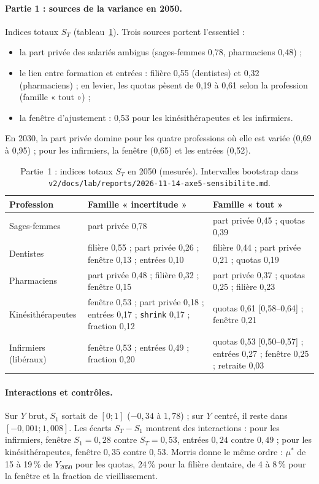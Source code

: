 \paragraph{Partie 1 : sources de la variance en 2050.} Indices totaux $S_T$ (tableau~\ref{sen:tab:st}). Trois sources
portent l'essentiel :
\begin{itemize}
  \item la part privée des salariés ambigus (sages-femmes 0,78\mesure{}, pharmaciens 0,48\mesure{}) ;
  \item le lien entre formation et entrées : filière 0,55\mesure{} (dentistes) et 0,32\mesure{} (pharmaciens) ;
        en levier, les quotas pèsent de 0,19 à 0,61\mesure{} selon la profession (famille « tout ») ;
  \item la fenêtre d'ajustement : 0,53\mesure{} pour les kinésithérapeutes et les infirmiers.
\end{itemize}
En 2030, la part privée domine pour les quatre professions où elle est variée (0,69 à 0,95\mesure{}) ; pour les
infirmiers, la fenêtre (0,65\mesure{}) et les entrées (0,52\mesure{}).

\begin{table}[h]
\centering\small
\begin{tabular}{lp{5.6cm}p{5.6cm}}
\toprule
Profession & Famille « incertitude » & Famille « tout » \\
\midrule
Sages-femmes & part privée 0,78 & part privée 0,45 ; quotas 0,39 \\
Dentistes & filière 0,55 ; part privée 0,26 ; fenêtre 0,13 ; entrées 0,10 & filière 0,44 ; part privée 0,21 ;
  quotas 0,19 \\
Pharmaciens & part privée 0,48 ; filière 0,32 ; fenêtre 0,15 & part privée 0,37 ; quotas 0,25 ; filière 0,23 \\
Kinésithérapeutes & fenêtre 0,53 ; part privée 0,18 ; entrées 0,17 ; \texttt{shrink} 0,17 ; fraction 0,12 &
  quotas 0,61 [0,58--0,64] ; fenêtre 0,21 \\
Infirmiers (libéraux) & fenêtre 0,53 ; entrées 0,49 ; fraction 0,20 & quotas 0,53 [0,50--0,57] ; entrées 0,27 ;
  fenêtre 0,25 ; retraite 0,03 \\
\bottomrule
\end{tabular}
\caption{Partie~1 : indices totaux $S_T$ en 2050 (mesurés\mesure{}). Intervalles bootstrap dans
\texttt{v2/docs/lab/reports/2026-11-14-axe5-sensibilite.md}.}
\label{sen:tab:st}
\end{table}

\paragraph{Interactions et contrôles.} Sur $Y$ brut, $S_1$ sortait de $[0 ; 1]$ ($-0{,}34$ à $1{,}78$\mesure{}) ; sur
$Y$ centré, il reste dans $[-0{,}001 ; 1{,}008]$\mesure{}. Les écarts $S_T - S_1$ montrent des interactions : pour
les infirmiers, fenêtre $S_1 = 0{,}28$ contre $S_T = 0{,}53$\mesure{}, entrées $0{,}24$ contre $0{,}49$\mesure{} ;
pour les kinésithérapeutes, fenêtre $0{,}35$ contre $0{,}53$\mesure{}. Morris donne le même ordre : $\mu^*$ de 15 à
19\mesure{}\,\% de $Y_{2050}$ pour les quotas, 24\mesure{}\,\% pour la filière dentaire, de 4 à 8\mesure{}\,\% pour
la fenêtre et la fraction de vieillissement.

